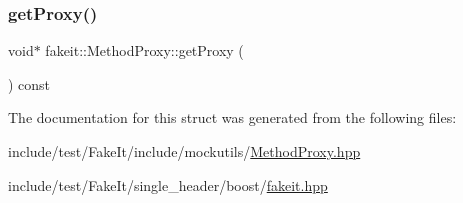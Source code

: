 \mbox{\label{structfakeit_1_1MethodProxy_ab27c6485484c610f7a35bb832fc571ea}} 
\subsubsection{\texorpdfstring{getProxy()}{getProxy()}\hspace{0.1cm}{\footnotesize\ttfamily [9/9]}}
{\footnotesize\ttfamily void$\ast$ fakeit\+::\+Method\+Proxy\+::get\+Proxy (\begin{DoxyParamCaption}{ }\end{DoxyParamCaption}) const\hspace{0.3cm}{\ttfamily [inline]}}



The documentation for this struct was generated from the following files\+:\begin{DoxyCompactItemize}
\item 
include/test/\+Fake\+It/include/mockutils/\mbox{\hyperlink{MethodProxy_8hpp}{Method\+Proxy.\+hpp}}\item 
include/test/\+Fake\+It/single\+\_\+header/boost/\mbox{\hyperlink{single__header_2boost_2fakeit_8hpp}{fakeit.\+hpp}}\end{DoxyCompactItemize}
